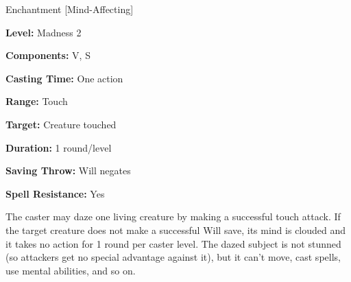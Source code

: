 
Enchantment [Mind-Affecting]

\textbf{Level:} Madness 2

\textbf{Components:} V, S

\textbf{Casting Time:} One action

\textbf{Range:} Touch

\textbf{Target:} Creature touched

\textbf{Duration:} 1 round/level

\textbf{Saving Throw:} Will negates

\textbf{Spell Resistance:} Yes

The caster may daze one living creature by making a successful touch attack. If 
the target creature does not make a successful Will save, its mind is clouded and 
it takes no action for 1 round per caster level. The dazed subject is not stunned 
(so attackers get no special advantage against it), but it can't move, cast spells, 
use mental abilities, and so on.
